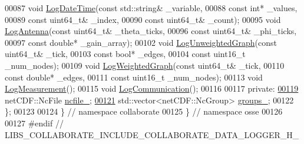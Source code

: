 \begin{DoxyCode}
00087   \textcolor{keywordtype}{void} \hyperlink{classosse_1_1collaborate_1_1_data_logger_ad185f66e5e4bc3b3097c784604afbe80}{LogDateTime}(\textcolor{keyword}{const} std::string& \_variable,
00088                    \textcolor{keyword}{const} \textcolor{keywordtype}{int}* \_values,
00089                    \textcolor{keyword}{const} uint64\_t& \_index,
00090                    \textcolor{keyword}{const} uint64\_t& \_count);
00095   \textcolor{keywordtype}{void} \hyperlink{classosse_1_1collaborate_1_1_data_logger_aef191bf287c09ccf4047addcf481c95b}{LogAntenna}(\textcolor{keyword}{const} uint64\_t& \_theta\_ticks,
00096                   \textcolor{keyword}{const} uint64\_t& \_phi\_ticks,
00097                   \textcolor{keyword}{const} \textcolor{keywordtype}{double}* \_gain\_array);
00102   \textcolor{keywordtype}{void} \hyperlink{classosse_1_1collaborate_1_1_data_logger_a024bca9bbbf41aeb8842308bc4feb3f2}{LogUnweightedGraph}(\textcolor{keyword}{const} uint64\_t& \_tick,
00103                           \textcolor{keyword}{const} \textcolor{keywordtype}{bool}* \_edges,
00104                           \textcolor{keyword}{const} uint16\_t \_num\_nodes);
00109   \textcolor{keywordtype}{void} \hyperlink{classosse_1_1collaborate_1_1_data_logger_a07727a2859558a395ab390b3b4d3dccb}{LogWeightedGraph}(\textcolor{keyword}{const} uint64\_t& \_tick,
00110                         \textcolor{keyword}{const} \textcolor{keywordtype}{double}* \_edges,
00111                         \textcolor{keyword}{const} uint16\_t \_num\_nodes);
00113   \textcolor{keywordtype}{void} \hyperlink{classosse_1_1collaborate_1_1_data_logger_a2eb3f81ae43ad620401c3ef93ffe690b}{LogMeasurement}();
00115   \textcolor{keywordtype}{void} \hyperlink{classosse_1_1collaborate_1_1_data_logger_aec7391008520ecbda02f46169823ce2a}{LogCommunication}();
00116 
00117  \textcolor{keyword}{private}:
\hyperlink{classosse_1_1collaborate_1_1_data_logger_ad24528379ccc57084cdc857c69744e37}{00119}   netCDF::NcFile \hyperlink{classosse_1_1collaborate_1_1_data_logger_ad24528379ccc57084cdc857c69744e37}{ncfile\_};
\hyperlink{classosse_1_1collaborate_1_1_data_logger_aba3561b8bf7fde66ba88062a3d96a5de}{00121}   std::vector<netCDF::NcGroup> \hyperlink{classosse_1_1collaborate_1_1_data_logger_aba3561b8bf7fde66ba88062a3d96a5de}{groups\_};
00122 \};
00123 
00124 \}  \textcolor{comment}{// namespace collaborate}
00125 \}  \textcolor{comment}{// namespace osse}
00126 
00127 \textcolor{preprocessor}{#endif  // LIBS\_COLLABORATE\_INCLUDE\_COLLABORATE\_DATA\_LOGGER\_H\_}
\end{DoxyCode}
